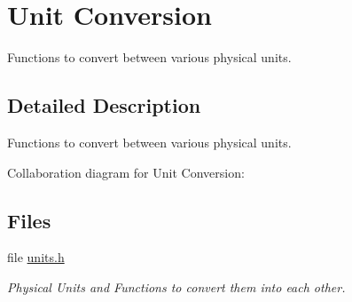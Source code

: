 \hypertarget{group__units}{}\section{Unit Conversion}
\label{group__units}


Functions to convert between various physical units.  




\subsection{Detailed Description}
Functions to convert between various physical units. 

Collaboration diagram for Unit Conversion\+:
\subsection*{Files}
\begin{DoxyCompactItemize}
\item 
file \mbox{\hyperlink{units_8h}{units.\+h}}
\begin{DoxyCompactList}\small\item\em Physical Units and Functions to convert them into each other. \end{DoxyCompactList}\end{DoxyCompactItemize}
